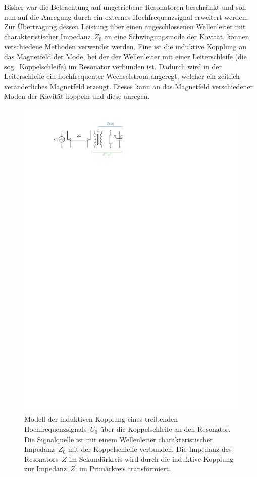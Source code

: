 Bisher war die Betrachtung auf ungetriebene Resonatoren beschränkt und soll nun auf die Anregung durch ein externes Hochfrequenzsignal erweitert werden.
Zur Übertragung dessen Leistung über einen angeschlossenen Wellenleiter mit charakteristischer Impedanz~$Z_0$ an eine Schwingungsmode der Kavität, können verschiedene Methoden verwendet werden.
Eine ist die induktive Kopplung an das Magnetfeld der Mode, bei der der Wellenleiter mit einer Leiterschleife (die sog.\ Koppelschleife) im Resonator verbunden ist.
Dadurch wird in der Leiterschleife ein hochfrequenter Wechselstrom angeregt, welcher ein zeitlich veränderliches Magnetfeld erzeugt. Dieses kann an das Magnetfeld verschiedener Moden der Kavität koppeln und diese anregen.
\begin{figure}[htb]
  \centering
  \includegraphics[scale=1.4]{./figs/RLC_coupling.pdf}
  \caption[Modell der induktiven Kopplung eines Hochfrequenzsignals über die Koppelschleife an den Resonator]{Modell der induktiven Kopplung eines treibenden Hochfrequenzsignals~$U_0$ über die Koppelschleife an den Resonator. Die Signalquelle ist mit einem Wellenleiter charakteristischer Impedanz~$Z_0$ mit der Koppelschleife verbunden. Die Impedanz des Resonators~$Z$ im Sekundärkreis wird durch die induktive Kopplung zur Impedanz~$Z^\prime$ im Primärkreis transformiert.}
  \label{fig:rlc_coupling}
\end{figure}

